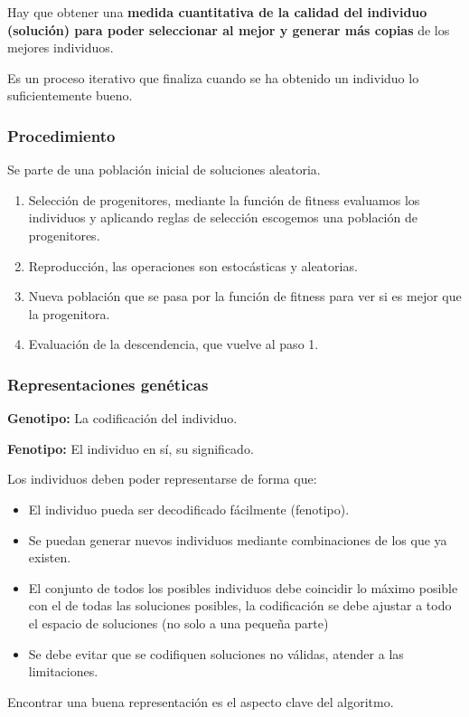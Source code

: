 \documentclass[12pt, twoside, openright]{report} %
\begin{document}
Hay que obtener una \textbf{medida cuantitativa de la calidad del individuo (solución) para poder seleccionar al mejor y generar más copias} de los mejores individuos.

Es un proceso iterativo que finaliza cuando se ha obtenido un individuo lo suficientemente bueno.

\subsubsection{Procedimiento}
Se parte de una población inicial de soluciones aleatoria.
\begin{enumerate}
	\item Selección de progenitores, mediante la función de fitness evaluamos los individuos y aplicando reglas de selección escogemos una población de progenitores.
	\item Reproducción, las operaciones son estocásticas y aleatorias.
	\item Nueva población que se pasa por la función de fitness para ver si es mejor que la progenitora.
	\item Evaluación de la descendencia, que vuelve al paso 1.
\end{enumerate}

\subsubsection{Representaciones genéticas}
\textbf{Genotipo:} La codificación del individuo.

\textbf{Fenotipo:} El individuo en sí, su significado.
\pagebreak

Los individuos deben poder representarse de forma que:
\begin{itemize}
	\item El individuo pueda ser decodificado fácilmente (fenotipo).
	\item Se puedan generar nuevos individuos mediante combinaciones de los que ya existen.
	\item El conjunto de todos los posibles individuos debe coincidir lo máximo posible con el de todas las soluciones posibles, la codificación se debe ajustar a todo el espacio de soluciones (no solo a una pequeña parte)
	\item Se debe evitar que se codifiquen soluciones no válidas, atender a las limitaciones.
\end{itemize}
Encontrar una buena representación es el aspecto clave del algoritmo.
\end{document}
